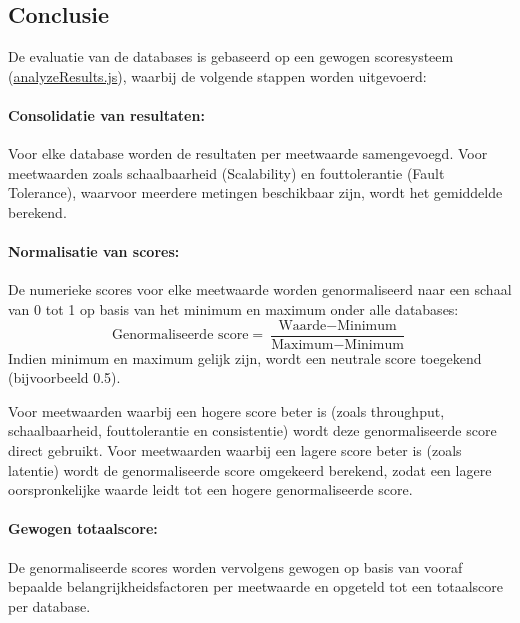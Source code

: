 \subsection{Conclusie}
De evaluatie van de databases is gebaseerd op een gewogen scoresysteem (\href{https://github.com/WoutVC/bachelorproef2024/blob/main/proof_of_concept/backend/analyzeResults.js}{analyzeResults.js}), waarbij de volgende stappen worden uitgevoerd:

\paragraph{Consolidatie van resultaten:} 
Voor elke database worden de resultaten per meetwaarde samengevoegd. Voor meetwaarden zoals schaalbaarheid (Scalability) en fouttolerantie (Fault Tolerance), waarvoor meerdere metingen beschikbaar zijn, wordt het gemiddelde berekend.

\paragraph{Normalisatie van scores:} 
De numerieke scores voor elke meetwaarde worden genormaliseerd naar een schaal van 0 tot 1 op basis van het minimum en maximum onder alle databases:
\[
\text{Genormaliseerde score} = \frac{\text{Waarde} - \text{Minimum}}{\text{Maximum} - \text{Minimum}}
\]
Indien minimum en maximum gelijk zijn, wordt een neutrale score toegekend (bijvoorbeeld 0.5).

Voor meetwaarden waarbij een hogere score beter is (zoals throughput, schaalbaarheid, fouttolerantie en consistentie) wordt deze genormaliseerde score direct gebruikt. Voor meetwaarden waarbij een lagere score beter is (zoals latentie) wordt de genormaliseerde score omgekeerd berekend, zodat een lagere oorspronkelijke waarde leidt tot een hogere genormaliseerde score.

\paragraph{Gewogen totaalscore:} 
De genormaliseerde scores worden vervolgens gewogen op basis van vooraf bepaalde belangrijkheidsfactoren per meetwaarde en opgeteld tot een totaalscore per database.


